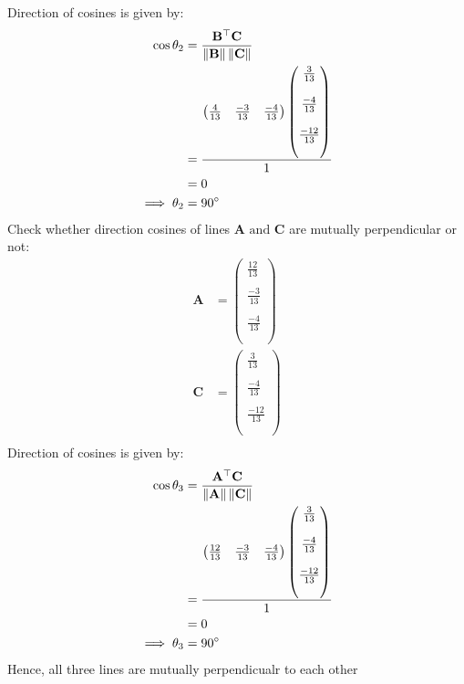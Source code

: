 \documentclass[12pt]{article}
\providecommand{\norm}[1]{\left\lVert#1\right\rVert}
\newcommand{\myvec}[1]{\ensuremath{\begin{pmatrix}#1\end{pmatrix}}}
\let\vec\mathbf
\begin{document}
Direction of cosines is given by:
\begin{align}
                          \cos\theta_2&=\frac{\vec{B}^\top\vec{C}}{\norm{\vec{B}}\norm{\vec{C}}}\\
        &=\frac{\myvec{\frac{4}{13}&\frac{-3}{13}&\frac{-4}{13}}\myvec{\frac{3}{13}\\\\\frac{-4}{13}\\\\\frac{-12}{13}\\\\}}{1}\\
                          &=0\\
		  \implies \theta_2&=90\degree
		  \end{align}
Check whether direction cosines of lines $\vec{A} \text{ and } \vec{C}$ are mutually perpendicular or not:
                   \begin{align}
    \vec{A}&=\myvec{\frac{12}{13}\\\\\frac{-3}{13}\\\\\frac{-4}{13}\\\\}\\
			   \vec{C}&=\myvec{\frac{3}{13}\\\\\frac{-4}{13}\\\\\frac{-12}{13}\\\\}\\    
		   \end{align}
	Direction of cosines is given by:
	\begin{align}
                          \cos\theta_3&=\frac{\vec{A}^\top\vec{C}}{\norm{\vec{A}}\norm{\vec{C}}}\\
   &=\frac{\myvec{\frac{12}{13}&\frac{-3}{13}&\frac{-4}{13}}\myvec{\frac{3}{13}\\\\\frac{-4}{13}\\\\\frac{-12}{13}\\\\}}{1}\\                  
			   &=0\\
		   \implies \theta_3&=90\degree  
		   \end{align}
Hence, all three lines are mutually perpendicualr to each other
\end{document}
